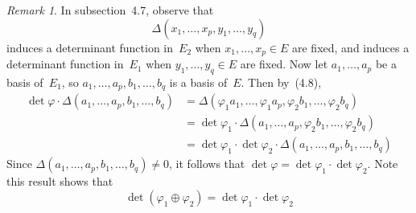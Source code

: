 \documentclass[letterpaper,12pt]{article}
\newcommand{\dsum}{\oplus}
\newcommand{\mult}{\cdot}
\theoremstyle{definition}
\theoremstyle{remark}
\newtheorem*{rmk}{Remark}
\begin{document}
\begin{rmk}
In subsection~4.7, observe that
\[\Delta(x_1,\ldots,x_p,y_1,\ldots,y_q)\]
induces a determinant function in~\(E_2\) when \(x_1,\ldots,x_p\in E\) are fixed, and induces a determinant function in~\(E_1\) when \(y_1,\ldots,y_q\in E\) are fixed. Now let \(a_1,\ldots,a_p\) be a basis of~\(E_1\), so \(a_1,\ldots,a_p,b_1,\ldots,b_q\) is a basis of~\(E\). Then by~(4.8),
\begin{align*}
\det\varphi\mult\Delta(a_1,\ldots,a_p,b_1,\ldots,b_q)&=\Delta(\varphi_1 a_1,\ldots,\varphi_1 a_p,\varphi_2 b_1,\ldots,\varphi_2 b_q)\\
	&=\det\varphi_1\mult\Delta(a_1,\ldots,a_p,\varphi_2 b_1,\ldots,\varphi_2 b_q)\\
	&=\det\varphi_1\mult\det\varphi_2\mult\Delta(a_1,\ldots,a_p,b_1,\ldots,b_q)
\end{align*}
Since \(\Delta(a_1,\ldots,a_p,b_1,\ldots,b_q)\ne0\), it follows that \(\det\varphi=\det\varphi_1\mult\det\varphi_2\). Note this result shows that
\[\det(\varphi_1\dsum\varphi_2)=\det\varphi_1\mult\det\varphi_2\]
\end{rmk}
\end{document}
